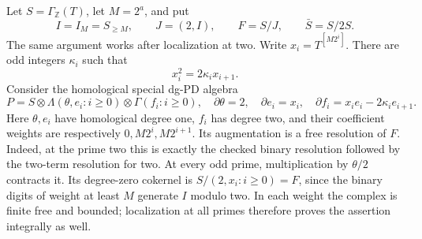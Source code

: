 Let \(S=\Gamma_{\mathbb Z}(T)\), let \(M=2^a\), and put
\[
 I=I_M=S_{\geq M},\qquad J=(2,I),\qquad
 F=S/J,\qquad \bar S=S/2S.
                                                               \tag{136.QT1}
\]
The same argument works after localization at two.  Write
\(x_i=T^{[M2^i]}\).  There are odd integers \(\kappa_i\)
such that
\[
 x_i^2=2\kappa_i x_{i+1}.
                                                               \tag{136.QT2}
\]
Consider the homological special dg-PD algebra
\[
 P=S\otimes\Lambda(\theta,e_i:i\geq0)
           \otimes\Gamma(f_i:i\geq0),
 \quad
 \partial\theta=2,\quad \partial e_i=x_i,\quad
 \partial f_i=x_i e_i-2\kappa_i e_{i+1}.
                                                               \tag{136.QT3}
\]
Here \(\theta,e_i\) have homological degree one, \(f_i\)
has degree two, and their coefficient weights are respectively
\(0,M2^i,M2^{i+1}\).  Its augmentation is a free resolution
of \(F\).  Indeed, at the prime two this is exactly the checked
binary resolution followed by the two-term resolution for two.
At every odd prime, multiplication by \(\theta/2\) contracts
it.  Its degree-zero cokernel is \(S/(2,x_i:i\geq0)=F\),
since the binary digits of weight at least \(M\) generate
\(I\) modulo two.  In each weight the complex is finite free
and bounded; localization at all primes therefore proves the
assertion integrally as well.

